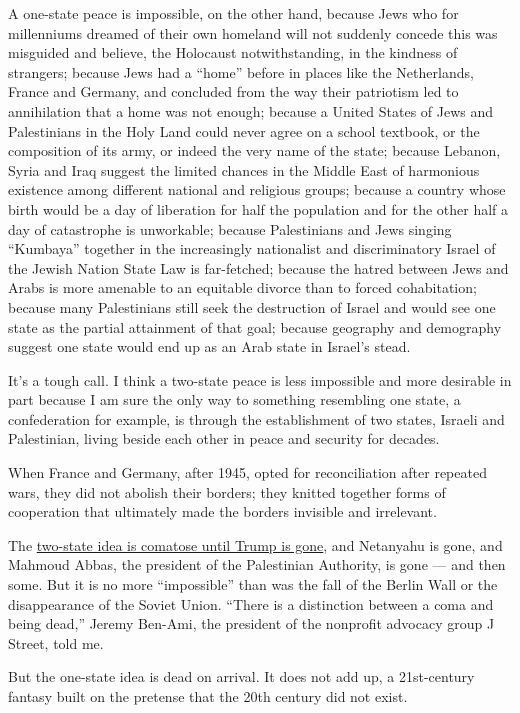 A one-state peace is impossible, on the other hand, because Jews who for
millenniums dreamed of their own homeland will not suddenly concede this
was misguided and believe, the Holocaust notwithstanding, in the
kindness of strangers; because Jews had a ``home'' before in places like
the Netherlands, France and Germany, and concluded from the way their
patriotism led to annihilation that a home was not enough; because a
United States of Jews and Palestinians in the Holy Land could never
agree on a school textbook, or the composition of its army, or indeed
the very name of the state; because Lebanon, Syria and Iraq suggest the
limited chances in the Middle East of harmonious existence among
different national and religious groups; because a country whose birth
would be a day of liberation for half the population and for the other
half a day of catastrophe is unworkable; because Palestinians and Jews
singing ``Kumbaya'' together in the increasingly nationalist and
discriminatory Israel of the Jewish Nation State Law is far-fetched;
because the hatred between Jews and Arabs is more amenable to an
equitable divorce than to forced cohabitation; because many Palestinians
still seek the destruction of Israel and would see one state as the
partial attainment of that goal; because geography and demography
suggest one state would end up as an Arab state in Israel's stead.

It's a tough call. I think a two-state peace is less impossible and more
desirable in part because I am sure the only way to something resembling
one state, a confederation for example, is through the establishment of
two states, Israeli and Palestinian, living beside each other in peace
and security for decades.

When France and Germany, after 1945, opted for reconciliation after
repeated wars, they did not abolish their borders; they knitted together
forms of cooperation that ultimately made the borders invisible and
irrelevant.

The
\href{https://www.nytimes.com/2017/12/07/us/politics/trump-jerusalem-palestinians.html}{two-state
idea is comatose until Trump is gone}, and Netanyahu is gone, and
Mahmoud Abbas, the president of the Palestinian Authority, is gone ---
and then some. But it is no more ``impossible'' than was the fall of the
Berlin Wall or the disappearance of the Soviet Union. ``There is a
distinction between a coma and being dead,'' Jeremy Ben-Ami, the
president of the nonprofit advocacy group J Street, told me.

But the one-state idea is dead on arrival. It does not add up, a
21st-century fantasy built on the pretense that the 20th century did not
exist.

